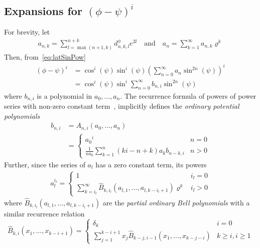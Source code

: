 \documentclass[a4paper]{amsart}
\begin{document}
\subsection{Expansions for $(\phi-\psi)^i$}
For brevity, let
\begin{gather*}
a_{n,k}=\sum_{l=\max(n+1,k)}^{n+k} d^\phi_{n,k,l} e^{2l}\quad\text{and}\quad
a_n =\sum_{k=1}^\infty a_{n,k}\varrho^k%
\end{gather*}
Then, from~\eqref{eq:latSinPow}
\begin{align*}
(\phi-\psi)^i&=\cos^i(\psi)\sin^i(\psi)\left(\sum_{n=0}^\infty a_n\sin^{2n}(\psi)\right)^i\\
 &=\cos^i(\psi)\sin^i\sum_{n=0}^\infty b_{n,i}\sin^{2n}(\psi)
\end{align*}
where $b_{n,i}$ is a polynomial in $a_0,\dots,a_n$. The recurrence formula of powers of power series with non-zero constant term~\cite{Gould1974}, implicitly defines the \emph{ordinary potential polynomials}
\begin{align*}
b_{n,i} &=A_{n,i}(a_0,\dots,a_n) \\
&=
\begin{cases}
{a_0}^i& n=0\\
 \frac{1}{na_0}\sum_{k=1}^n(ki-n+k){a_k}b_{n-k,i}& n> 0
\end{cases}
\end{align*}
Further, since the series of $a_l$ has a zero constant term, its powers~\cite{Taghavian2023}%
\begin{align*}
a_l^{i_l}=
\begin{cases}
1 & i_l = 0 \\
\sum_{k=i_l}^\infty \hat{B}_{k,i_l}(a_{l,1},\dots,a_{l,k-i_l+1})\varrho^k & i_l>0
\end{cases}
\end{align*}
where $\hat{B}_{k,i_l}(a_{l,1},\dots,a_{l,k-i_l+1})$ are the \emph{partial ordinary Bell polynomials} with a similar recurrence relation
\begin{equation*}
\hat{B}_{k,i}(x_1,\dots,x_{k-i+1})=
\begin{cases}
\delta_k & i = 0 \\
\sum_{j=1}^{k-i+1}x_j\hat{B}_{k-j,i-1}(x_1,\dots,x_{k-j-i}) & k \geq i, i \geq 1
\end{cases}
\end{equation*}
\end{document}
